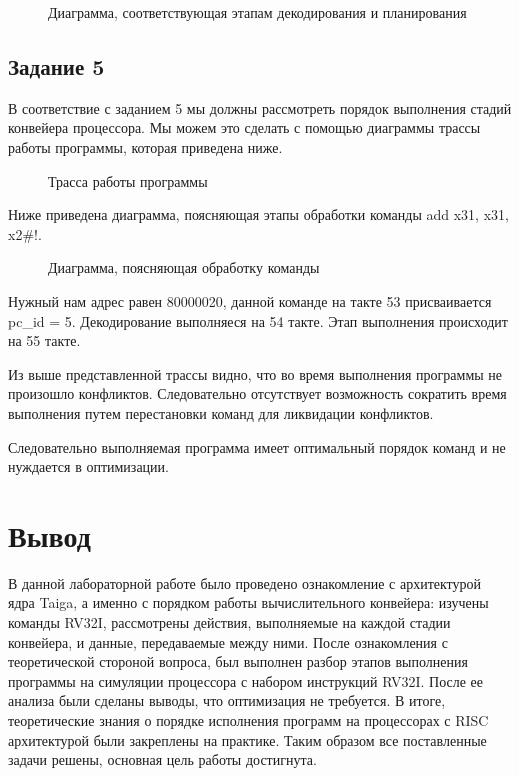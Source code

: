\begin{figure}[ph!]
	\caption{Диаграмма, соответствующая этапам декодирования и планирования}
\end{figure}

\section{Задание 5}

В соответствие с заданием 5 мы должны рассмотреть порядок выполнения стадий конвейера процессора. Мы можем это сделать с помощью диаграммы трассы работы программы, которая приведена ниже.

\begin{figure}[ph!]
	\caption{Трасса работы программы}
\end{figure}

Ниже приведена диаграмма, поясняющая этапы обработки команды add x31, x31, x2\#!.

\newpage

\begin{figure}[ph!]
	\caption{Диаграмма, поясняющая обработку команды}
\end{figure}

Нужный нам адрес равен 80000020, данной команде на такте 53 присваивается pc\_id = 5. Декодирование выполняеся на 54 такте. Этап выполнения происходит на 55 такте.

Из выше представленной трассы видно, что во время выполнения программы не произошло конфликтов. Следовательно отсутствует возможность сократить время выполнения путем перестановки команд для ликвидации конфликтов.

Следовательно выполняемая программа имеет оптимальный порядок команд и не нуждается в оптимизации.

\chapter{Вывод}
В данной лабораторной работе было проведено ознакомление с архитектурой ядра Taiga, а именно с порядком работы вычислительного конвейера: изучены команды RV32I, рассмотрены действия, выполняемые на каждой стадии конвейера, и данные, передаваемые между ними. После ознакомления с теоретической стороной вопроса, был выполнен разбор этапов выполнения программы на симуляции процессора с набором инструкций RV32I. После ее анализа были сделаны выводы, что оптимизация не требуется. В итоге, теоретические знания о порядке исполнения программ на процессорах с RISC архитектурой были закреплены на практике. Таким образом все поставленные задачи решены, основная цель работы достигнута.
